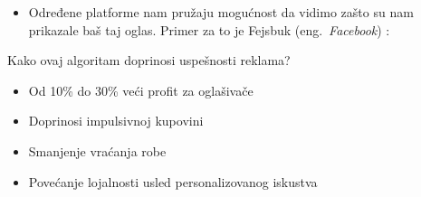 \documentclass{beamer}
\begin{document}
	\begin{frame}
		\begin{itemize}
			\item Određene platforme nam pružaju mogućnost da vidimo zašto su nam prikazale baš taj oglas. Primer za to je Fejsbuk (eng.~{\em Facebook}) :
		\end{itemize}
		\begin{figure}[h!]
			\begin{center}
			\end{center}
		\end{figure}
	\end{frame}
	
	\begin{frame}{Kako ovaj algoritam doprinosi uspešnosti reklama?}
		\begin{itemize}
			\item Od 10\% do 30\% veći profit za oglašivače
			\item Doprinosi impulsivnoj kupovini
			\item Smanjenje vraćanja robe
			\item Povećanje lojalnosti usled personalizovanog iskustva
		\end{itemize}
	\end{frame}
	
\end{document}
